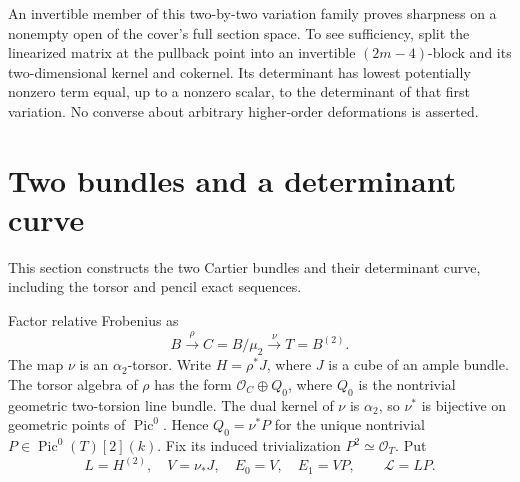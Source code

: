 \documentclass[11pt]{article}
\theoremstyle{definition}\newtheorem{definition}[theorem]{Definition}
\theoremstyle{remark}\newtheorem{remark}[theorem]{Remark}
\newcommand{\OO}{\mathcal O}
\newcommand{\Pic}{\operatorname{Pic}}
\begin{document}
An invertible member of this two-by-two variation family proves sharpness on a nonempty open of the cover's full section space. To see sufficiency, split the linearized matrix at the pullback point into an invertible $(2m-4)$-block and its two-dimensional kernel and cokernel. Its determinant has lowest potentially nonzero term equal, up to a nonzero scalar, to the determinant of that first variation. No converse about arbitrary higher-order deformations is asserted.

\section{Two bundles and a determinant curve}
\label{sec:curve}

This section constructs the two Cartier bundles and their determinant curve, including the torsor and pencil exact sequences.

Factor relative Frobenius as
\[
 B\xrightarrow{\rho}C=B/\mu _2\xrightarrow{\nu}T=B^{(2)}.
\]
The map $\nu$ is an $\alpha _2$-torsor. Write $H=\rho^*J$, where $J$ is a cube of an ample bundle. The torsor algebra of $\rho$ has the form $\OO_C\oplus Q_0$, where $Q_0$ is the nontrivial geometric two-torsion line bundle. The dual kernel of $\nu$ is $\alpha _2$, so $\nu^*$ is bijective on geometric points of $\Pic^0$. Hence $Q_0=\nu^*P$ for the unique nontrivial $P\in\Pic^0(T)[2](k)$. Fix its induced trivialization $P^2\simeq\OO_T$. Put
\[
 L=H^{(2)},\quad V=\nu_*J,\quad E_0=V,\quad E_1=VP,
 \qquad \mathcal L=LP.
\]
\end{document}

